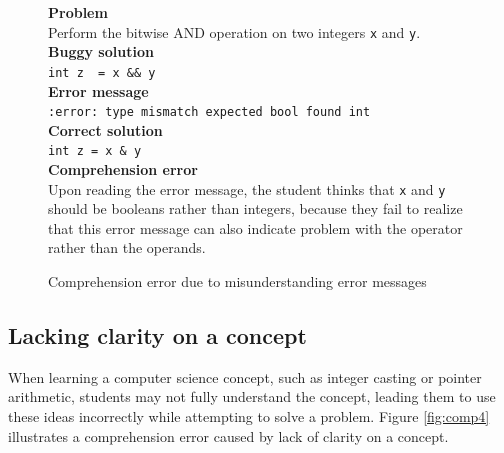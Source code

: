 \documentclass[11pt,letterpaper]{article}
\begin{document}
\begin{figure}
\begin{framed}
\setlength{\parindent}{0cm}
\textbf{Problem} \\
Perform the bitwise AND operation on two integers \texttt{x} and \texttt{y}.\\

\textbf{Buggy solution} \\
\verb|int z  = x && y|\\

\textbf{Error message}\\
\texttt{:error: type mismatch expected bool found int}\\

\textbf{Correct solution}\\
\verb|int z = x & y|\\

\textbf{Comprehension error}\\
Upon reading the error message, the student thinks that \texttt{x} and \texttt{y} should be booleans rather than integers, because they fail to realize that this error message can also indicate problem with the operator rather than the operands.
\end{framed}
\caption{Comprehension error due to misunderstanding error messages}
\label{fig:comp3}
\end{figure}

\subsection{Lacking clarity on a concept}
When learning a computer science concept, such as integer casting or pointer arithmetic, students may not fully understand the concept, leading them to use these ideas incorrectly while attempting to solve a problem. Figure \ref{fig:comp4} illustrates a comprehension error caused by lack of clarity on a concept.
\end{document}
